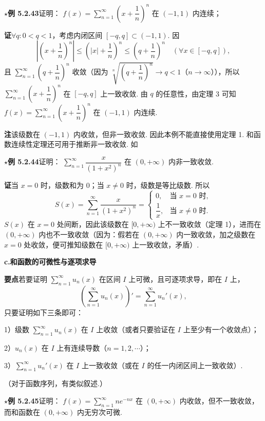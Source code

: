 \documentclass[UTF8, 12pt, fontset=fandol, oneside]{ctexart}
\begin{document}
\noindent\textbf{$\star$例 5.2.43}\quad 证明：
$f(x)=\displaystyle\sum_{n=1}^{\infty}\left(x+\dfrac1n\right)^n$ 在
$(-1,1)$ 内连续；

\noindent\textbf{证}\quad $\forall q:0<q<1$，考虑内闭区间 $[-q,q]\subset(-1,1)$. 因
\[
  \left|\left(x+\frac1n\right)^n\right|
  \le\left(|x|+\frac1n\right)^n
  \le\left(q+\frac1n\right)^n
  \quad(\forall x\in[-q,q]),
\]
且 $\displaystyle\sum_{n=1}^{\infty}\left(q+\dfrac1n\right)^n$ 收敛（因为
$\sqrt[n]{\left(q+\dfrac1n\right)^n}\to q<1$（$n\to\infty$）），所以
$\displaystyle\sum_{n=1}^{\infty}\left(x+\dfrac1n\right)^n$ 在 $[-q,q]$ 上一致收敛. 由
$q$ 的任意性，由定理 3 可知
$f(x)=\displaystyle\sum_{n=1}^{\infty}\left(x+\dfrac1n\right)^n$ 在 $(-1,1)$ 内连续.

\noindent\textbf{注}\quad 该级数在 $(-1,1)$ 内收敛，但非一致收敛. 因此本例不能直接使用定理 1. 和函数连续性定理还可用于推断非一致收敛. 如

\noindent\textbf{$\star$例 5.2.44}\quad 证明：
$\displaystyle\sum_{n=1}^{\infty}\dfrac{x}{(1+x^2)^n}$ 在 $(0,+\infty)$ 内非一致收敛.

\noindent\textbf{证}\quad 当 $x=0$ 时，级数和为 0；当 $x\ne0$ 时，级数是等比级数. 所以
\[
  S(x)=\sum_{n=1}^{\infty}\frac{x}{(1+x^2)^n}
  =
  \begin{cases}
    0,& \text{当 }x=0\text{ 时},\\
    \dfrac1x,& \text{当 }x\ne0\text{ 时}.
  \end{cases}
\]
$S(x)$ 在 $x=0$ 处间断，因此该级数在 $[0,+\infty)$ 上不一致收敛（定理 1），进而在
$(0,+\infty)$ 内也不一致收敛（因为：假若在 $(0,+\infty)$ 内一致收敛，加之级数在
$x=0$ 处收敛，便可推知级数在 $[0,+\infty)$ 上一致收敛，矛盾）.

\noindent\textbf{c.\quad 和函数的可微性与逐项求导}

\noindent\textbf{要点}\quad 若要证明 $\displaystyle\sum_{n=1}^{\infty}u_n(x)$ 在区间 $I$ 上可微，且可逐项求导，即在
$I$ 上，
\[
  \left(\sum_{n=1}^{\infty}u_n(x)\right)'
  =\sum_{n=1}^{\infty}u_n'(x),
\]
只要证明如下三条即可：

1）级数 $\displaystyle\sum_{n=1}^{\infty}u_n(x)$ 在 $I$ 上收敛（或者只要验证在
$I$ 上至少有一个收敛点）；

2）$u_n(x)$ 在 $I$ 上有连续导数（$n=1,2,\cdots$）；

3）$\displaystyle\sum_{n=1}^{\infty}u_n'(x)$ 在 $I$ 上一致收敛（或在 $I$ 的任一内闭区间上一致收敛）.

（对于函数序列，有类似叙述.）

\noindent\textbf{$\star$例 5.2.45}\quad 证明：
$f(x)=\displaystyle\sum_{n=1}^{\infty}ne^{-nx}$ 在 $(0,+\infty)$ 内收敛，但不一致收敛，而和函数在
$(0,+\infty)$ 内无穷次可微.
\end{document}
